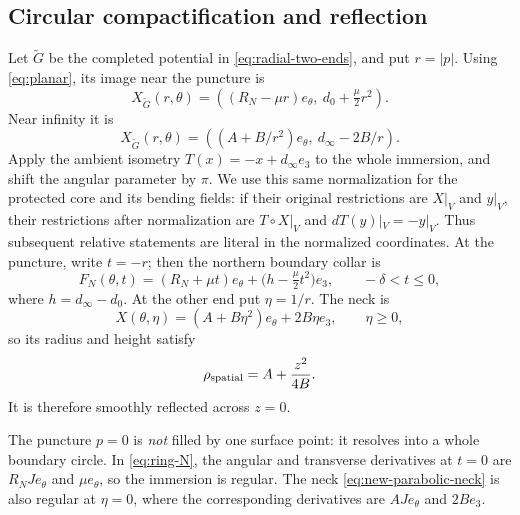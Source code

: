 \documentclass[11pt]{amsart}
\theoremstyle{definition}
\theoremstyle{remark}
\numberwithin{equation}{section}
\begin{document}
\subsection{Circular compactification and reflection}
Let $\widetilde G$ be the completed potential in
\eqref{eq:radial-two-ends}, and put $r=|p|$.
Using \eqref{eq:planar}, its image near the puncture is
\begin{equation}\label{eq:new-polar-immersion}
 X_{\widetilde G}(r,\theta)=
 ((R_N-\mu r)e_\theta,\ d_0+\tfrac\mu2r^2).
\end{equation}
Near infinity it is
\begin{equation}\label{eq:new-neck-immersion}
 X_{\widetilde G}(r,\theta)=
 ((A+B/r^2)e_\theta,\ d_\infty-2B/r).
\end{equation}
Apply the ambient isometry $T(x)=-x+d_\infty e_3$ to the whole
immersion, and shift the angular parameter by $\pi$. We use this same
normalization for the protected core and its bending fields: if their
original restrictions are $X|_V$ and $y|_V$, their restrictions after
normalization are $T\circ X|_V$ and $dT(y)|_V=-y|_V$. Thus subsequent
relative statements are literal in the normalized coordinates. At the
puncture, write $t=-r$;
then the northern boundary collar is
\begin{equation}\label{eq:ring-N}
 F_N(\theta,t)=(R_N+\mu t)e_\theta
       +\bigl(h-\tfrac\mu2t^2\bigr)e_3,
 \qquad -\delta<t\le0,
\end{equation}
where $h=d_\infty-d_0$. At the other end put $\eta=1/r$.
The neck is
\begin{equation}\label{eq:new-parabolic-neck}
 X(\theta,\eta)=(A+B\eta^2)e_\theta+2B\eta e_3,
 \qquad \eta\ge0,
\end{equation}
so its radius and height satisfy
\begin{equation}\label{eq:parabolic-profile}
 \rho_{\rm spatial}=A+\frac{z^2}{4B}.
\end{equation}
It is therefore smoothly reflected across $z=0$.

The puncture $p=0$ is \emph{not} filled by one surface point: it
resolves into a whole boundary circle. In \eqref{eq:ring-N}, the
angular and transverse derivatives at $t=0$ are
$R_NJe_\theta$ and $\mu e_\theta$, so the immersion is regular.
The neck \eqref{eq:new-parabolic-neck} is also regular at $\eta=0$,
where the corresponding derivatives are $AJe_\theta$ and $2Be_3$.
\end{document}
